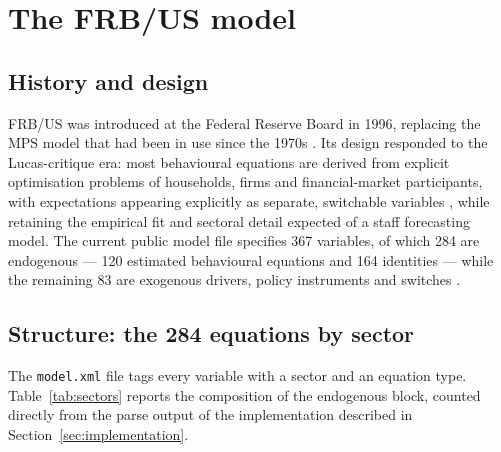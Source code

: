 \section{The FRB/US model}
\label{sec:model}

\subsection{History and design}

FRB/US was introduced at the Federal Reserve Board in 1996, replacing the MPS model that had been in use since the 1970s \citep{brayton1996guide, brayton1997evolution}. Its design responded to the Lucas-critique era: most behavioural equations are derived from explicit optimisation problems of households, firms and financial-market participants, with expectations appearing explicitly as separate, switchable variables \citep{brayton1997role}, while retaining the empirical fit and sectoral detail expected of a staff forecasting model. The current public model file specifies 367 variables, of which 284 are endogenous --- 120 estimated behavioural equations and 164 identities --- while the remaining 83 are exogenous drivers, policy instruments and switches \citep{fedfrbuspython}.

\subsection{Structure: the 284 equations by sector}
\label{sec:sectors}

The \texttt{model.xml} file tags every variable with a sector and an equation type. Table~\ref{tab:sectors} reports the composition of the endogenous block, counted directly from the parse output of the implementation described in Section~\ref{sec:implementation}.

